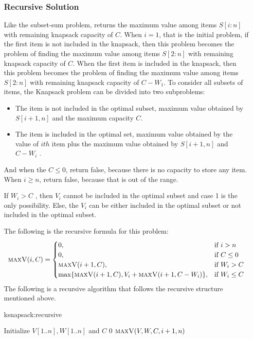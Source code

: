 \documentclass[11pt]{article}
\theoremstyle{definition}
\begin{document}
\subsubsection{Recursive Solution}
Like the subset-sum problem,  returns the maximum value among items $S[i : n]$ with remaining knapsack capacity of $C$. When $i=1$, that is the initial problem, if the first item is not included in the knapsack, then this problem becomes the problem of finding the maximum value among items $S[2 : n]$ with remaining knapsack capacity of $C$. When the first item is included in the knapsack, then this problem becomes the problem of finding the maximum value among items $S[2 : n]$ with remaining knapsack capacity of $C-W_1$.
To consider all subsets of items, the Knapsack problem can be divided into two subproblems: 
\begin{itemize}
    \item The item is not included in the optimal subset, maximum value obtained by $S[i+1,n]$ and the maximum capacity $C$.
    \item The item is included in the optimal set, maximum value obtained by the value of $ith$ item plus the maximum value obtained by $S[i+1,n]$ and $C-W_i$ .
\end{itemize}
And when the $C\leq 0$, return false, because there is no capacity to store any item. When $i\ge n$, return false, because that is out of the range.

If $W_i>C$ , then $V_i$ cannot be included in the optimal subset and case 1 is the only possibility. Else,  the $V_i$ can be either included in the optimal subset or not included in the optimal subset.

The following is the recursive formula for this problem:
\[
\Call{maxV}{i,C} =
\begin{cases} 
0,  & \mbox{if }i>n \\
0, & \mbox{if }C\leq 0\\
\Call{maxV}{i+1,C},& \mbox{if } W_i>C\\
\max\{\Call{maxV}{i+1,C},V_i+\Call{maxV}{i+1,C-W_i}\},& \mbox{if } W_i \leq C
\end{cases}
\]
The following is a recursive algorithm that follows the recursive structure mentioned above.\\
\begin{algorithm}[H]
\caption{ksnapsack:recursive}\label{ksnapsack:recursive}
\begin{algorithmic}[1]
\State Initialize $V[1..n], W[1..n]$ and $C$
\State{}
\EndFunction
\State{\null}
    \State\Return $0$
    \EndIf
    \State\Return $\Call{maxV}{V, W, C, i+1, n}$
    \Else 
    \State{}
    \EndIf
\EndFunction
\end{algorithmic}
\end{algorithm}
\end{document}
